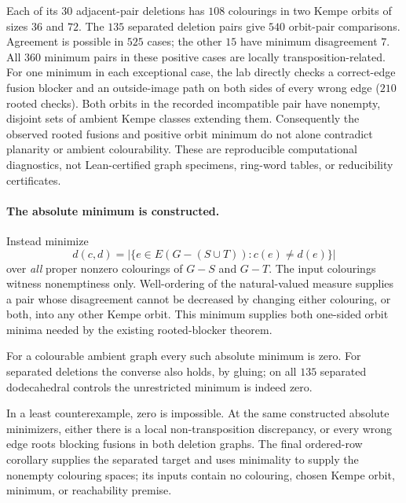 Each of its $30$ adjacent-pair deletions has $108$ colourings in two
Kempe orbits of sizes $36$ and $72$. The $135$ separated deletion pairs
give $540$ orbit-pair comparisons. Agreement is possible in $525$ cases;
the other $15$ have minimum disagreement $7$. All $360$ minimum pairs
in these positive cases are locally transposition-related. For one
minimum in each exceptional case, the lab directly checks a correct-edge
fusion blocker and an outside-image path on both sides of every wrong
edge ($210$ rooted checks). Both orbits in the recorded incompatible
pair have nonempty, disjoint sets of ambient Kempe classes extending
them. Consequently the observed rooted fusions and positive orbit minimum
do not alone contradict planarity or ambient colourability.
These are reproducible computational diagnostics, not Lean-certified
graph specimens, ring-word tables, or reducibility certificates.

\paragraph{The absolute minimum is constructed.}
Instead minimize
\[
  d(c,d)=|\{e\in E(G-(S\cup T)):c(e)\ne d(e)\}|
\]
over \emph{all} proper nonzero colourings of $G-S$ and $G-T$.
The input colourings witness nonemptiness only. Well-ordering of the
natural-valued measure supplies a pair whose disagreement cannot be
decreased by changing either colouring, or both, into any other Kempe
orbit. This minimum supplies both one-sided orbit minima needed by the
existing rooted-blocker theorem.

For a colourable ambient graph every such absolute minimum is zero.
For separated deletions the converse also holds, by gluing; on all $135$
separated dodecahedral controls the unrestricted minimum is indeed zero.

In a least counterexample, zero is impossible. At the same constructed
absolute minimizers, either there is a local non-transposition discrepancy,
or every wrong edge roots blocking fusions in both deletion graphs.
The final ordered-row corollary supplies the separated target and uses
minimality to supply the nonempty colouring spaces; its inputs contain
no colouring, chosen Kempe orbit, minimum, or reachability premise.

